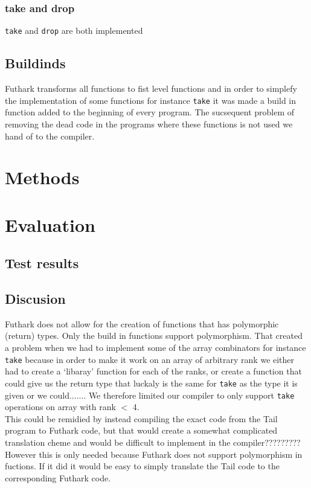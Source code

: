 \documentclass[11pt]{article}
\begin{document}
\subsubsection{take and drop}
\verb|take| and \verb|drop| are both implemented

\subsection{Buildinds}
Futhark transforms all functions to fist level functions and in order to simplefy the implementation of some functions for instance \verb|take| it was made a build in function added to the beginning of every program. The sucsequent problem of removing the dead code in the programs where these functions is not used we hand of to the compiler.



\section{Methods}
\section{Evaluation}
\subsection{Test results}
\subsection{Discusion}
Futhark does not allow for the creation of functions that has polymorphic (return) types. Only the build in functions support polymorphism. That created a problem when we had to implement some of the array combinators for instance  \verb|take| because in order to make it work on an array of arbitrary rank we either had to create a `libaray' function for each of the ranks, or create a function that could give us the return type that luckaly is the same for \verb|take| as the type it is given or we could....... 
We therefore limited our compiler to only support \verb|take| operations on array with rank \(< \) 4. \\ %

This could be remidied by instead compiling the exact code from the Tail program to Futhark code, but that would create a somewhat complicated translation cheme and would be difficult to implement in the compiler????????? %
However this is only needed because Futhark does not support polymorphism in fuctions. If it did it would be easy to simply translate the Tail code to the corresponding Futhark code.
\end{document}

